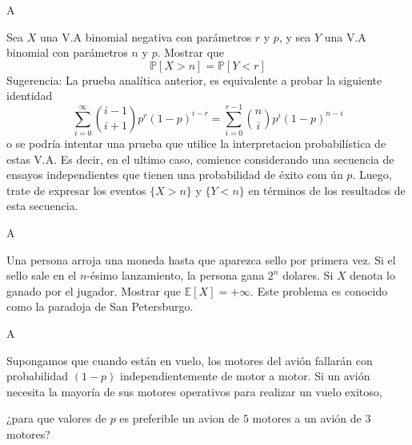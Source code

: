 \documentclass[12pt,answers,addpoints,a4paper]{exam}%
\begin{document}
\begin{questions}
	\begin{solutionorbox}
		A
	\end{solutionorbox}
	
	\unframedsolutions
	
	
	\question Sea $X$ una V.A binomial negativa con parámetros $r$ y $p$, y sea $Y$ una V.A binomial con parámetros $n$ y $p$. Mostrar que
	\begin{equation*}
	\mathds{P}[X>n]=\mathds{P}[Y<r]
	\end{equation*}
	Sugerencia: La prueba analítica anterior, es equivalente a probar la siguiente identidad
	\begin{equation*}
	\sum_{i=0}^{\infty}\binom{i-1}{i+1}p^{r}{(1-p)}^{i-r}=\sum_{i=0}^{r-1}\binom{n}{i}p^{i}{(1-p)}^{n-i}
	\end{equation*}
	o se podría intentar una prueba que utilice la interpretacion probabilística de estas V.A. Es decir, en el ultimo caso, comience considerando una secuencia de ensayos independientes que tienen una probabilidad de éxito com ún $p$.	Luego, trate de expresar los eventos $\{X > n\}$ y $\{Y < n\}$ en términos de los resultados de esta secuencia.
	
	\begin{solutionorbox}
		A
	\end{solutionorbox}
	
	\question Una persona arroja una moneda hasta que aparezca sello por primera vez. Si el sello sale en el $n$-ésimo lanzamiento, la persona gana $2^{n}$ dolares. Si $X$ denota lo ganado por el jugador. Mostrar que $\mathds{E}[X]= +\infty$. Este problema es conocido como la paradoja de San Petersburgo.
	

	\begin{solutionorbox}
	A
	\end{solutionorbox}

	\question Supongamos que cuando están en vuelo, los motores del avión
	fallarán con probabilidad $(1-p)$ independientemente de motor a motor. Si un avión necesita la mayoría de sus motores operativos para realizar un vuelo exitoso,

¿para que valores de $p$ es preferible un avion de $5$ motores a un avión de $3$ motores?
\end{questions}

\begin{center}
	\gradetable[h][questions]
\end{center}
\end{document}
